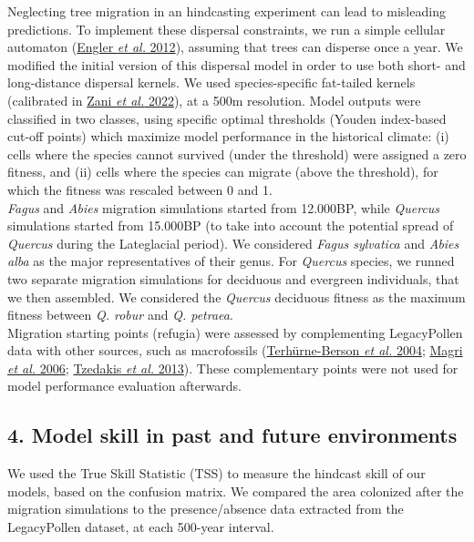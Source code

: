\documentclass[11pt,]{article}
\begin{document}
Neglecting tree migration in an hindcasting experiment can lead to
misleading predictions. To implement these dispersal constraints, we run
a simple cellular automaton (\protect\hyperlink{ref-Engler2012}{Engler
\emph{et al.} 2012}), assuming that trees can disperse once a year. We
modified the initial version of this dispersal model in order to use
both short- and long-distance dispersal kernels. We used
species-specific fat-tailed kernels (calibrated in
\protect\hyperlink{ref-Zani2022}{Zani \emph{et al.} 2022}), at a 500m
resolution. Model outputs were classified in two classes, using specific
optimal thresholds (Youden index-based cut-off points) which maximize
model performance in the historical climate: (i) cells where the species
cannot survived (under the threshold) were assigned a zero fitness, and
(ii) cells where the species can migrate (above the threshold), for
which the fitness was rescaled between 0 and 1.\\
\emph{Fagus} and \emph{Abies} migration simulations started from
12.000BP, while \emph{Quercus} simulations started from 15.000BP (to
take into account the potential spread of \emph{Quercus} during the
Lateglacial period). We considered \emph{Fagus sylvatica} and
\emph{Abies alba} as the major representatives of their genus. For
\emph{Quercus} species, we runned two separate migration simulations for
deciduous and evergreen individuals, that we then assembled. We
considered the \emph{Quercus} deciduous fitness as the maximum fitness
between \emph{Q. robur} and \emph{Q. petraea}.\\
Migration starting points (refugia) were assessed by complementing
LegacyPollen data with other sources, such as macrofossils
(\protect\hyperlink{ref-TerhuerneBerson2004}{Terhürne-Berson \emph{et
al.} 2004}; \protect\hyperlink{ref-Magri2006}{Magri \emph{et al.} 2006};
\protect\hyperlink{ref-Tzedakis2013}{Tzedakis \emph{et al.} 2013}).
These complementary points were not used for model performance
evaluation afterwards.

\hypertarget{model-skill-in-past-and-future-environments}{%
\subsection{4. Model skill in past and future
environments}\label{model-skill-in-past-and-future-environments}}

We used the True Skill Statistic (TSS) to measure the hindcast skill of
our models, based on the confusion matrix. We compared the area
colonized after the migration simulations to the presence/absence data
extracted from the LegacyPollen dataset, at each 500-year interval.
\end{document}
